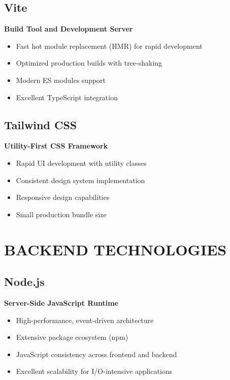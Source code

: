 \subsection{Vite}

\textbf{Build Tool and Development Server}

\begin{itemize}
\item Fast hot module replacement (HMR) for rapid development
\item Optimized production builds with tree-shaking
\item Modern ES modules support
\item Excellent TypeScript integration
\end{itemize}

\subsection{Tailwind CSS}

\textbf{Utility-First CSS Framework}

\begin{itemize}
\item Rapid UI development with utility classes
\item Consistent design system implementation
\item Responsive design capabilities
\item Small production bundle size
\end{itemize}

\section{BACKEND TECHNOLOGIES}

\subsection{Node.js}

\textbf{Server-Side JavaScript Runtime}

\begin{itemize}
\item High-performance, event-driven architecture
\item Extensive package ecosystem (npm)
\item JavaScript consistency across frontend and backend
\item Excellent scalability for I/O-intensive applications
\end{itemize}

